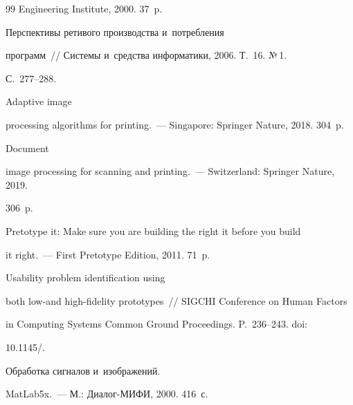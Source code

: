 {{\begin{thebibliography}{99}
Engineering Institute, 2000. 37~p.




 Перспективы ретивого производства и~по\-треб\-ле\-ния 


программ~/\!\!/ Сис\-те\-мы и~средства информатики, 2006. Т.~16. №\,1.  


С.~277--288.




 Adaptive image 


processing algorithms for printing.~--- Singapore: Springer Nature, 2018. 304~p.




 Document 


image processing for scanning and printing.~--- Switzerland: Springer Nature, 2019. 


306~p.




 Pretotype it: Make sure you are building the right it before you build 


it right.~--- First Pretotype Edition, 2011. 71~p.




 Usability problem identification using 


both low-and high-fidelity prototypes~/\!\!/ SIGCHI Conference on Human Factors 


in Computing Systems Common Ground Proceedings. P.~236--243. doi: 


10.1145\!/.




 Обработка сигналов и~изображений. 


\mbox{MatLab5x}.~--- М.: Диалог-\mbox{МИФИ}, 2000. 416~с.


   \end{thebibliography}


} }











\vspace*{-7pt}





